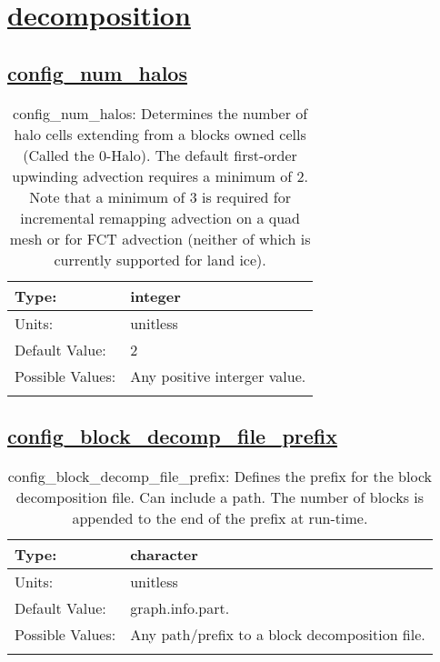 \section[decomposition]{\hyperref[sec:nm_tab_decomposition]{decomposition}}
\label{sec:nm_sec_decomposition}
\subsection[config\_num\_halos]{\hyperref[sec:nm_tab_decomposition]{config\_num\_halos}}
\label{subsec:nm_sec_config_num_halos}
\begin{center}
\begin{longtable}{| p{2.0in} || p{4.0in} |}
    \hline
    Type: & integer \\
    \hline
    Units: & \si{unitless} \\
    \hline
    Default Value: & 2 \\
    \hline
    Possible Values: & Any positive interger value. \\
    \hline
    \caption{config\_num\_halos: Determines the number of halo cells extending from a blocks owned cells (Called the 0-Halo). The default first-order upwinding advection requires a minimum of 2.  Note that a minimum of 3 is required for incremental remapping advection on a quad mesh or for FCT advection (neither of which is currently supported for land ice).}
\end{longtable}
\end{center}
\subsection[config\_block\_decomp\_file\_prefix]{\hyperref[sec:nm_tab_decomposition]{config\_block\_decomp\_file\_prefix}}
\label{subsec:nm_sec_config_block_decomp_file_prefix}
\begin{center}
\begin{longtable}{| p{2.0in} || p{4.0in} |}
    \hline
    Type: & character \\
    \hline
    Units: & \si{unitless} \\
    \hline
    Default Value: & graph.info.part. \\
    \hline
    Possible Values: & Any path/prefix to a block decomposition file. \\
    \hline
    \caption{config\_block\_decomp\_file\_prefix: Defines the prefix for the block decomposition file. Can include a path. The number of blocks is appended to the end of the prefix at run-time.}
\end{longtable}
\end{center}
